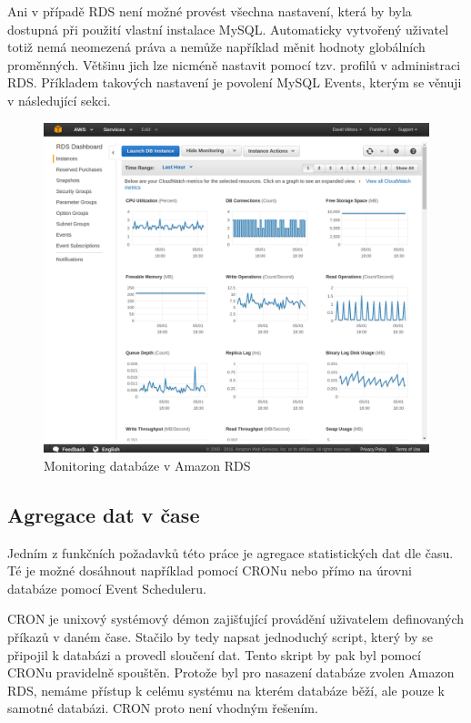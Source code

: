 \documentclass[thesis=B,czech]{FITthesis}[2012/06/26]
\begin{document}
	Ani v případě RDS není možné provést všechna nastavení, která by byla dostupná při použití vlastní instalace MySQL. Automaticky vytvořený uživatel totiž nemá neomezená práva a nemůže například měnit hodnoty globálních proměnných. Většinu jich lze nicméně nastavit pomocí tzv. profilů v administraci RDS. Příkladem takových nastavení je povolení MySQL Events, kterým se věnuji v následující sekci. 

\begin{figure}[h]
   	\centering
   	\includegraphics[width=1\textwidth]{images/aws-monitoring.png}
   	\caption{Monitoring databáze v Amazon RDS}
   	\label{fig:aws_monitoring}
\end{figure}
	
\subsection{Agregace dat v čase}
	Jedním z funkčních požadavků této práce je agregace statistických dat dle času. Té je možné dosáhnout například pomocí CRONu nebo přímo na úrovni databáze pomocí Event Scheduleru. 
	
	CRON je unixový systémový démon zajišťující provádění uživatelem definovaných příkazů v daném čase. Stačilo by tedy napsat jednoduchý script, který by se připojil k databázi a provedl sloučení dat. Tento skript by pak byl pomocí CRONu pravidelně spouštěn. Protože byl pro nasazení databáze zvolen Amazon RDS, nemáme přístup k celému systému na kterém databáze běží, ale pouze k samotné databázi. CRON proto není vhodným řešením. 
	
\end{document}
